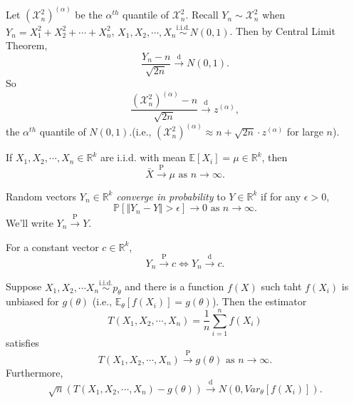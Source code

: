 \documentclass[a4paper]{article}
\begin{document}
\begin{eg}
	Let $(\mathcal{X}_n^2)^{(\alpha)}$ be the $\alpha^{th}$ quantile of $\mathcal{X}_n^2$. Recall $Y_n \sim \mathcal{X}_n^2$ when $Y_n = X_1^2 + X_2^2 + \cdots + X_n^2$, $X_1,X_2,\cdots,X_n \stackrel{\text{i.i.d.}}{\sim} N(0,1)$. Then by Central Limit Theorem,
	\begin{equation}
		\frac{Y_n - n}{\sqrt{2n}} \stackrel{\text{d}}{\longrightarrow} N(0,1).
	\end{equation}
	So
	\begin{equation}
		\frac{(\mathcal{X}_n^2)^{(\alpha)} - n}{\sqrt{2n}} \stackrel{\text{d}}{\longrightarrow} z^{(\alpha)},
	\end{equation}
	the $\alpha^{th}$ quantile of $N(0,1)$.(i.e., $(\mathcal{X}_n^2)^{(\alpha)} \approx n + \sqrt{2n} \cdot z^{(\alpha)}$ for large $n$).
\end{eg}

\begin{thm}
	If $X_1,X_2,\cdots,X_n \in \mathbb{R}^k$ are i.i.d. with mean $\mathbb{E}[X_i] = \mu \in \mathbb{R}^k$, then
	\begin{equation}
		\bar{X} \stackrel{\text{P}}{\longrightarrow} \mu \text{ as } n \to \infty.
	\end{equation}
\end{thm}

\begin{defi}
	Random vectors $Y_n \in \mathbb{R}^k$ \emph{converge in probability} to $Y \in \mathbb{R}^k$ if for any $\epsilon > 0$,
	\begin{equation}
		\mathbb{P}[\Vert Y_n - Y \Vert > \epsilon] \to 0 \text{ as } n \to \infty.
	\end{equation}
	We'll write $Y_n \stackrel{\text{P}}{\longrightarrow} Y$.
\end{defi}

\begin{note}
	For a constant vector $c \in \mathbb{R}^k$,
	\begin{equation}
		Y_n \stackrel{\text{P}}{\longrightarrow} c \iff Y_n \stackrel{\text{d}}{\longrightarrow} c.
	\end{equation}
\end{note}

\begin{eg}
	Suppose $X_1, X_2, \cdots X_n \stackrel{\text{i.i.d.}}{\sim} p_{\theta}$ and there is a function $f(X)$ such taht $f(X_i)$ is unbiased for $g(\theta)$ (i.e., $\mathbb{E}_{\theta}[f(X_i)] = g(\theta)$). Then the estimator
	\begin{equation*}
		T(X_1, X_2, \cdots, X_n) = \frac{1}{n} \sum\limits_{i=1}^nf(X_i)
	\end{equation*}
	satisfies
	\begin{equation}
		T(X_1, X_2, \cdots, X_n) \stackrel{\text{P}}{\longrightarrow} g(\theta) \text{ as } n \to \infty.
	\end{equation}
	Furthermore,
	\begin{equation}
		\sqrt{n}(T(X_1, X_2, \cdots, X_n) - g(\theta)) \stackrel{\text{d}}{\longrightarrow} N(0,Var_{\theta}[f(X_i)]).
	\end{equation}
\end{eg}
\end{document}
